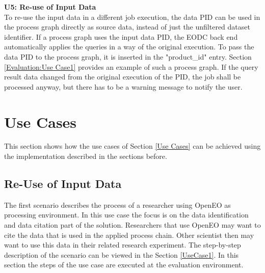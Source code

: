 \documentclass[draft,final]{vutinfth} %
\begin{document}
\textbf{U5: Re-use of Input Data} \\
To re-use the input data in a different job execution, the data PID can be used in the process graph directly as source data, instead of just the unfiltered dataset identifier. If a process graph uses the input data PID, the EODC back end automatically applies the queries in a way of the original execution. To pass the data PID to the process graph, it is inserted in the "product\_id" entry. Section \ref{Evaluation:Use Case1} provides an example of such a process graph. If the query result data changed from the original execution of the PID, the job shall be processed anyway, but there has to be a warning message to notify the user.  

\section{Use Cases}
This section shows how the use cases of Section \ref{Use Cases}  can be achieved using the implementation described in the sections before.

\subsection{Re-Use of Input Data}\label{Implementation:Use Case1}
The first scenario describes the process of a researcher using OpenEO as processing environment. In this use case the focus is on the data identification and data citation part of the solution. Researchers that use OpenEO may want to cite the data that is used in the applied process chain. Other scientist then may want to use this data in their related research experiment. The step-by-step description of the scenario can be viewed in the Section \ref{UseCase1}. In this section the steps of the use case are executed at the evaluation environment.
\end{document}
